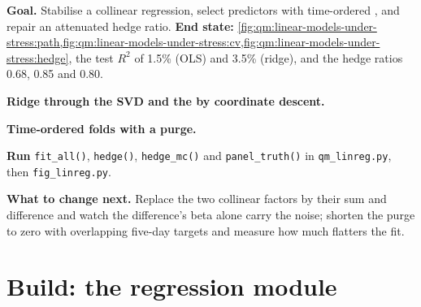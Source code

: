 \begin{tutorial}
\textbf{Goal.} Stabilise a collinear regression, select predictors with time-ordered , and repair an attenuated hedge ratio.
\textbf{End state:} \cref{fig:qm:linear-models-under-stress:path,fig:qm:linear-models-under-stress:cv,fig:qm:linear-models-under-stress:hedge}, the
test $R^2$ of 1.5\% (OLS) and 3.5\% (ridge), and the hedge ratios 0.68, 0.85 and 0.80.
\begin{tutsteps}
\item \textbf{Ridge through the SVD and the  by coordinate descent.}
\label{lst:qm:linear-models-under-stress:enet}
\item \textbf{Time-ordered folds with a purge.}
\label{lst:qm:linear-models-under-stress:folds}
\item \textbf{Run} \texttt{fit\_all()}, \texttt{hedge()}, \texttt{hedge\_mc()} and \texttt{panel\_truth()} in \texttt{qm\_linreg.py}, then
\texttt{fig\_linreg.py}.
\end{tutsteps}
\textbf{What to change next.} Replace the two collinear factors by their sum and difference and watch the difference's beta alone carry the
noise; shorten the purge to zero with overlapping five-day targets and measure how much  flatters the fit.
\end{tutorial}

\section{Build: the regression module}\label{bld:qm:linear-models-under-stress:linreg}

